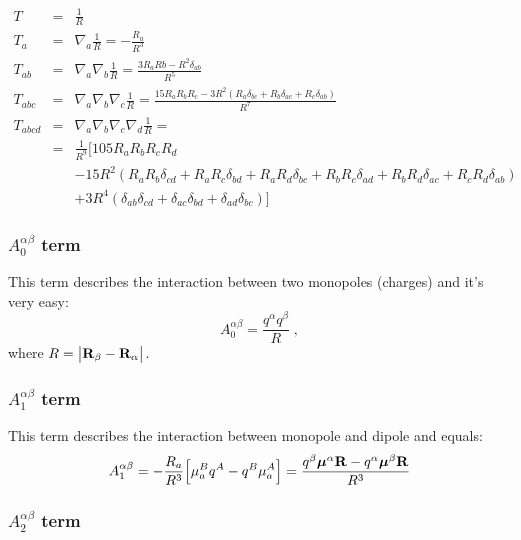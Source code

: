 \documentclass[a4paper,titlepage,twoside,fleqn]{article}
\newcommand{\BM}[1]{\ensuremath{\mbox{\boldmath${#1}$}}}
\begin{document}
\begin{eqnarray}\label{e:T}
T       &=& \frac{1}{R} \\
T_a     &=& \nabla_a\frac{1}{R} = -\frac{R_a}{R^3} \\
T_{ab}  &=& \nabla_a\nabla_b\frac{1}{R} = \frac{3R_aRb-R^2\delta_{ab}}{R^5} \\
T_{abc} &=& \nabla_a\nabla_b\nabla_c\frac{1}{R} = 
            \frac{15R_aR_bR_c-3R^2(R_a\delta_{bc}+R_b\delta_{ac}+R_c\delta_{ab})}{R^7} \\
T_{abcd}&=& \nabla_a\nabla_b\nabla_c\nabla_d\frac{1}{R} =\\ \nonumber
        &=& \frac{1}{R^9} 
            \Big[ 105R_aR_bR_cR_d \\ \nonumber
        & &     - 15R^2(R_aR_b\delta_{cd} + R_aR_c\delta_{bd} + R_aR_d\delta_{bc} +
                  R_bR_c\delta_{ad} + R_bR_d\delta_{ac} + R_cR_d\delta_{ab}) \\ \nonumber
        & &     + 3R^4(\delta_{ab}\delta_{cd} + \delta_{ac}\delta_{bd} + \delta_{ad}\delta_{bc}) 
            \Big]
\end{eqnarray}

\subsubsection*{$A^{\alpha\beta}_0$ term}

This term describes the interaction between two monopoles
(charges) and it's very easy:
\begin{equation}
A^{\alpha\beta}_0= \frac{q^{\alpha}q^{\beta}}{R} \;, 
\end{equation}  
where $R=\big|{\bf R}_{\beta}-{\bf R}_{\alpha}\big|$.

\subsubsection*{$A^{\alpha\beta}_1$ term}

This term describes the interaction between monopole and
dipole and equals:
\begin{equation}
A^{\alpha\beta}_1= -\frac{R_a}{R^3} 
\Big[ 
    \mu^B_a q^A -
    q^B \mu^A_a 
\Big] = \frac{q^{\beta}{\BM \mu}^{\alpha}{\bf R} - q^{\alpha}{\BM \mu}^{\beta}{\bf R}}   {R^3} 
\end{equation}  

\subsubsection*{$A^{\alpha\beta}_2$ term}
\end{document}
